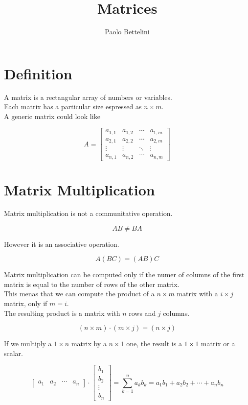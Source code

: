 \documentclass{article}
\title{Matrices}
\author{Paolo Bettelini}
\date{}
\begin{document}
\maketitle
\tableofcontents
\pagebreak

\section{Definition}

A matrix is a rectangular array of numbers or variables. \\
Each matrix has a particular size espressed as \(n \times m\). \\
A generic matrix could look like

\[
A = \begin{bmatrix} 
        a_{1,1} & a_{1,2} & \cdots & a_{1,m} \\
        a_{2,1} & a_{2,2} & \cdots & a_{2,m} \\
        \vdots  & \vdots  & \ddots & \vdots  \\
        a_{n,1} & a_{n,2} & \cdots & a_{n,m} 
    \end{bmatrix}
\]

\section{Matrix Multiplication}

Matrix multiplication is not a communitative operation.

\[
    AB\neq BA
\]

However it is an associative operation.

\[
    A(BC)=(AB)C
\]

Matrix multiplication can be computed only if the numer of columns of the first matrix is equal to the number of rows of the other matrix. \\
This menas that we can compute the product of a \(n \times m\) matrix with a \(i \times j\) matrix, only if \(m=i\). \\
The resulting product is a matrix with \(n\) rows and \(j\) columns.

\[
    (n \times m) \cdot (m \times j) = (n \times j)
\]

If we multiply a \(1 \times n\) matrix by a \(n \times 1\) one, the result is a \(1 \times 1\) matrix or a scalar.

\[
    \begin{bmatrix} 
        a_1 & a_2 & \cdots & a_n
    \end{bmatrix}
    \cdot
    \begin{bmatrix} 
        b_1 \\
        b_2 \\
        \vdots \\
        b_n
    \end{bmatrix}
    = \sum_{k=1}^{n} a_k b_k = a_1 b_1 + a_2 b_2 + \cdots + a_n b_n
\]
\end{document}
